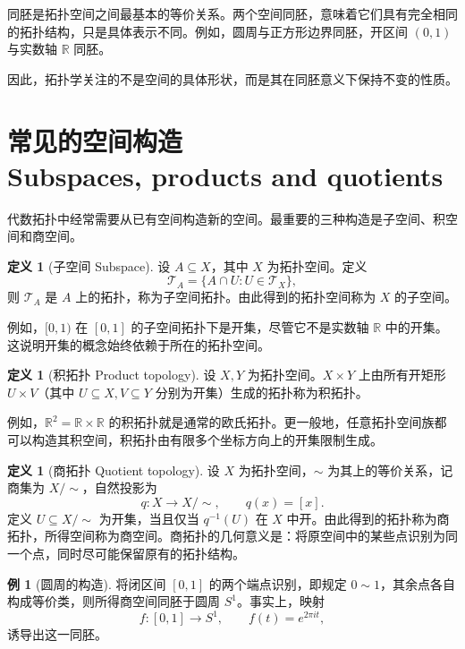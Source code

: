 \documentclass[12pt,a4paper,UTF8]{ctexart}
\newcommand{\R}{\mathbb{R}}
\theoremstyle{definition}
\newtheorem{definition}[theorem]{定义}
\newtheorem{example}[theorem]{例}
\begin{document}
同胚是拓扑空间之间最基本的等价关系。两个空间同胚，意味着它们具有完全相同的拓扑结构，只是具体表示不同。例如，圆周与正方形边界同胚，开区间 $(0,1)$ 与实数轴 $\R$ 同胚。

因此，拓扑学关注的不是空间的具体形状，而是其在同胚意义下保持不变的性质。

\section{常见的空间构造\\
Subspaces, products and quotients}

代数拓扑中经常需要从已有空间构造新的空间。最重要的三种构造是子空间、积空间和商空间。

\begin{definition}[子空间 Subspace]
设 $A\subseteq X$，其中 $X$ 为拓扑空间。定义
\[
\mathcal T_A=\{A\cap U:U\in\mathcal T_X\},
\]
则 $\mathcal T_A$ 是 $A$ 上的拓扑，称为子空间拓扑。由此得到的拓扑空间称为 $X$ 的子空间。
\end{definition}

例如，$[0,1)$ 在 $[0,1]$ 的子空间拓扑下是开集，尽管它不是实数轴 $\R$ 中的开集。这说明开集的概念始终依赖于所在的拓扑空间。

\begin{definition}[积拓扑 Product topology]
设 $X,Y$ 为拓扑空间。$X\times Y$ 上由所有开矩形 $U\times V$（其中 $U\subseteq X,V\subseteq Y$ 分别为开集）生成的拓扑称为积拓扑。
\end{definition}

例如，$\R^2=\R\times\R$ 的积拓扑就是通常的欧氏拓扑。更一般地，任意拓扑空间族都可以构造其积空间，积拓扑由有限多个坐标方向上的开集限制生成。

\begin{definition}[商拓扑 Quotient topology]
设 $X$ 为拓扑空间，$\sim$ 为其上的等价关系，记商集为 $X/{\sim}$，自然投影为
\[
q:X\to X/{\sim},\qquad q(x)=[x].
\]
定义 $U\subseteq X/{\sim}$ 为开集，当且仅当 $q^{-1}(U)$ 在 $X$ 中开。由此得到的拓扑称为商拓扑，所得空间称为商空间。商拓扑的几何意义是：将原空间中的某些点识别为同一个点，同时尽可能保留原有的拓扑结构。
\end{definition}

\begin{example}[圆周的构造]
将闭区间 $[0,1]$ 的两个端点识别，即规定 $0\sim1$，其余点各自构成等价类，则所得商空间同胚于圆周 $S^1$。事实上，映射
\[
f:[0,1]\to S^1,\qquad f(t)=e^{2\pi i t},
\]
诱导出这一同胚。
\end{example}
\end{document}
